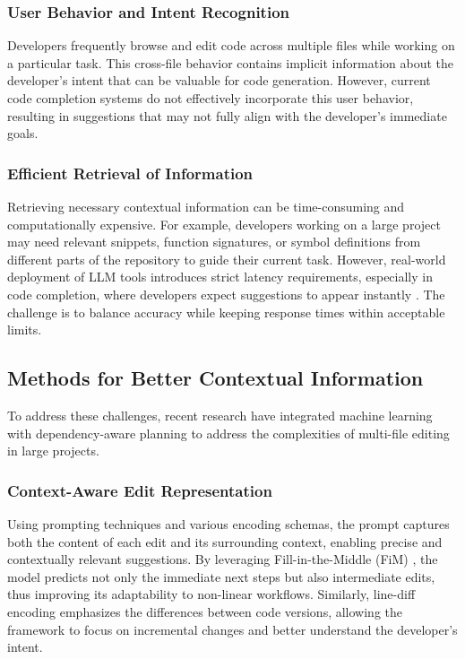 \subsubsection{User Behavior and Intent Recognition}
Developers frequently browse and edit code across multiple files while working on a particular task. This cross-file behavior contains implicit information about the developer’s intent \cite{coeditor, coedpilot} that can be valuable for code generation. However, current code completion systems \cite{copilot, codeium, marscode} do not effectively incorporate this user behavior, resulting in suggestions that may not fully align with the developer’s immediate goals. 

\subsubsection{Efficient Retrieval of Information}
Retrieving necessary contextual information can be time-consuming and computationally expensive. For example, developers working on a large project may need relevant snippets, function signatures, or symbol definitions from different parts of the repository to guide their current task. However, real-world deployment of LLM tools introduces strict latency requirements, especially in code completion, where developers expect suggestions to appear instantly \cite{cursorai}. The challenge is to balance accuracy while keeping response times within acceptable limits.


\subsection{Methods for Better Contextual Information}

To address these challenges, recent research have integrated machine learning with dependency-aware planning to address the complexities of multi-file editing in large projects.

\subsubsection{Context-Aware Edit Representation}

Using prompting techniques and various encoding schemas, the prompt captures both the content of each edit and its surrounding context, enabling precise and contextually relevant suggestions. By leveraging Fill-in-the-Middle (FiM) \cite{bavarian2022efficienttraininglanguagemodels}, the model predicts not only the immediate next steps but also intermediate edits, thus improving its adaptability to non-linear workflows. Similarly, line-diff encoding emphasizes the differences between code versions, allowing the framework to focus on incremental changes and better understand the developer's intent.

